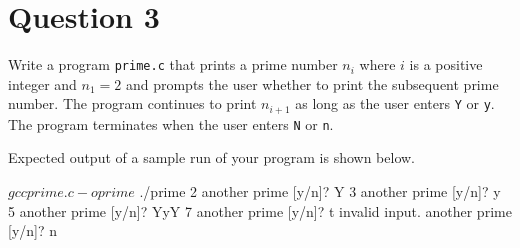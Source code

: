 
\section*{Question 3}

Write a program \texttt{prime.c} that prints a prime number $n_i$ where $i$ is a positive integer and $n_1 = 2$ and prompts the user whether to print the subsequent prime number.
The program continues to print $n_{i+1}$ as long as the user enters \texttt{Y} or \texttt{y}.
The program terminates when the user enters \texttt{N} or \texttt{n}.

Expected output of a sample run of your program is shown below.

\begin{terminal}
$ gcc prime.c -o prime
$ ./prime
2
another prime [y/n]? Y
3
another prime [y/n]? y
5
another prime [y/n]? YyY
7
another prime [y/n]? t
invalid input.
another prime [y/n]? n
\end{terminal}

